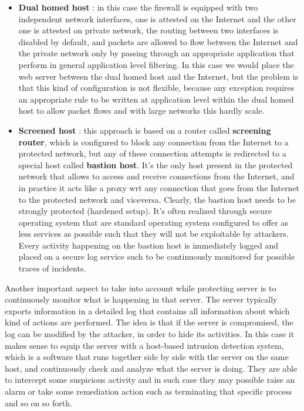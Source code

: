 \begin{itemize}
\item \textbf{Dual homed host} : in this case the firewall is equipped with two independent network interfaces, one is attested on the Internet and the other one is attested on private network, the routing between two interfaces is disabled by default, and packets are allowed to flow between the Internet and the private network only by passing through an appropriate application that perform in general application level filtering. In this case we would place the web server between the dual homed host and the Internet, but the problem is that this kind of configuration is not flexible, because any exception requires an appropriate rule to be written at application level within the dual homed host to allow packet flows and with large networks this hardly scale.
\item \textbf{Screened host} : this approach is based on a router called \textbf{screening router}, which is configured to block any connection from the Internet to a protected network, but any of these connection attempts is redirected to a special host called \textbf{bastion host}. It's the only host present in the protected network that allows to access and receive connections from the Internet, and in practice it acts like a proxy wrt any connection that goes from the Internet to the protected network and viceversa. Clearly, the bastion host needs to be strongly protected (hardened setup). It's often realized through secure operating system that are standard operating system configured to offer as less services as possible such that they will not be exploitable by attackers. Every activity happening on the bastion host is immediately logged and placed on a secure log service such to be continuously monitored for possible traces of incidents.
\end{itemize}
Another important aspect to take into account while protecting server is to continuously monitor what is happening in that server. The server typically exports information in a  detailed log that contains all information about which kind of actions are performed. The idea is that if the server is compromised, the log can be modified by the attacker, in order to hide its activities. In this case it makes sense to equip the server with a host-based intrusion detection system, which is a software that runs together side by side with the server on the same host, and continuously check and analyze what the server is doing. They are able to intercept some suspicious activity and in such case they may possible raise an alarm or take some remediation action such as terminating that specific process and so on so forth.

